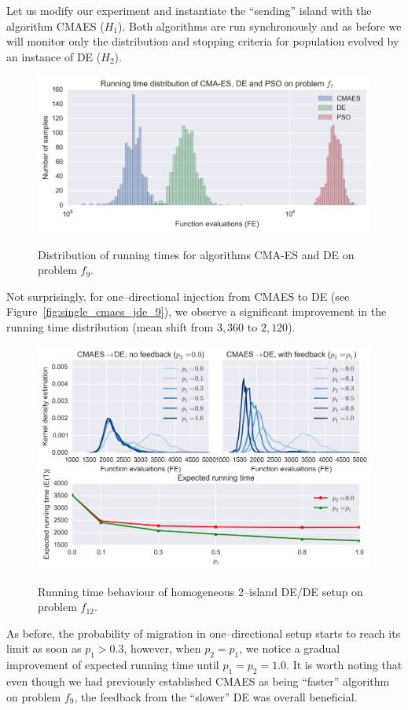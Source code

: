 \documentclass{sig-alternate}
\begin{document}
Let us modify our experiment and instantiate the ``sending'' island with the algorithm CMAES ($H_1$).
Both algorithms are run synchronously and as before we will monitor only the distribution and stopping criteria for population evolved by an instance of DE ($H_2$).
\begin{figure}[ht]
    \centering
    \includegraphics[width=\columnwidth]{figures/single_distr_7.png}
    \label{fig:distr_cmaes_jde_9}
    \caption{Distribution of running times for algorithms CMA-ES and DE on problem $f_9$.}
\end{figure}
Not surprisingly, for one--directional injection from CMAES to DE (see Figure~\ref{fig:single_cmaes_jde_9}), we observe a significant improvement in the running time distribution (mean shift from $3,360$ to $2,120$).
\begin{figure}[ht]
  \centering
  \includegraphics[width=\columnwidth]{figures/single_cmaes_jde_cec_7.png}
  \label{fig:single_jde_jde_7}
 \caption{Running time behaviour of homogeneous 2--island DE/DE setup on problem $f_{12}$.}
\end{figure}
As before, the probability of migration in one--directional setup starts to reach its limit as soon as $p_1 > 0.3$, however, when $p_2 = p_1$, we notice a gradual improvement of expected running time until $p_1=p_2=1.0$.
It is worth noting that even though we had previously established CMAES as being ``faster'' algorithm on problem $f_9$, the feedback from the ``slower'' DE was overall beneficial.
\end{document}

